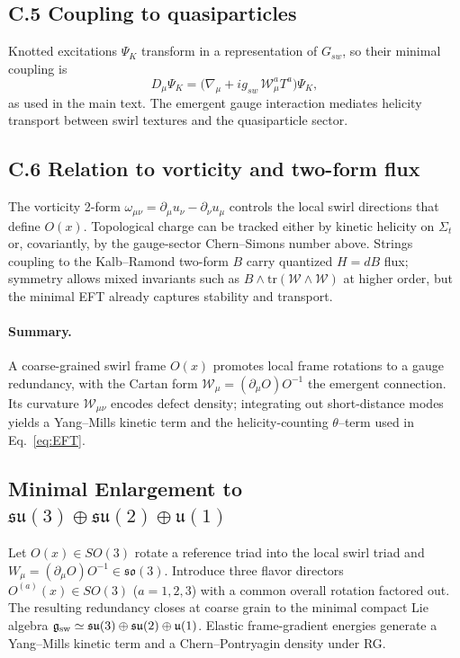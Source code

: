 \documentclass[11pt, preprint,titlepage]{revtex4-2}
\begin{document}
		\subsection*{C.5 Coupling to quasiparticles}
		Knotted excitations \(\Psi_K\) transform in a representation of \(G_{\!sw}\), so their minimal coupling is
		\[
		D_\mu\Psi_K=\big(\nabla_\mu + i g_{\!sw}\,\mathcal{W}_\mu^a T^a\big)\Psi_K,
		\]
		as used in the main text. The emergent gauge interaction mediates helicity transport between swirl textures and the quasiparticle sector.

		\subsection*{C.6 Relation to vorticity and two-form flux}
		The vorticity 2-form \(\omega_{\mu\nu}=\partial_\mu u_\nu-\partial_\nu u_\mu\) controls the local swirl directions that define \(O(x)\).
		Topological charge can be tracked either by kinetic helicity on \(\Sigma_t\) or, covariantly, by the gauge-sector Chern–Simons number above. Strings coupling to the Kalb–Ramond two-form \(B\) carry quantized \(H=dB\) flux; symmetry allows mixed invariants such as \(B\wedge\mathrm{tr}(\mathcal{W}\wedge\mathcal{W})\) at higher order, but the minimal EFT already captures stability and transport.

		\paragraph{Summary.}
		A coarse-grained swirl frame \(O(x)\) promotes local frame rotations to a gauge redundancy, with the Cartan form \(\mathcal{W}_\mu=(\partial_\mu O)O^{-1}\) the emergent connection. Its curvature \(\mathcal{W}_{\mu\nu}\) encodes defect density; integrating out short-distance modes yields a Yang–Mills kinetic term and the helicity-counting \(\theta\)–term used in Eq.~\eqref{eq:EFT}.

		\subsection{Minimal Enlargement to \texorpdfstring{$\mathfrak{su}(3)\oplus\mathfrak{su}(2)\oplus\mathfrak u(1)$}{su(3)+su(2)+u(1)}}
		Let \(O(x)\in SO(3)\) rotate a reference triad into the local swirl triad and \(W_\mu=(\partial_\mu O)O^{-1}\in\mathfrak{so}(3)\).
		Introduce three flavor directors \(O^{(a)}(x)\in SO(3)\) (\(a=1,2,3\)) with a common overall rotation factored out.
		The resulting redundancy closes at coarse grain to the minimal compact Lie algebra
		\(\mathfrak g_{\rm sw}\simeq \mathfrak{su}(3)\oplus\mathfrak{su}(2)\oplus\mathfrak u(1)\).
		Elastic frame-gradient energies generate a Yang--Mills kinetic term and a Chern--Pontryagin density under RG.
\end{document}
